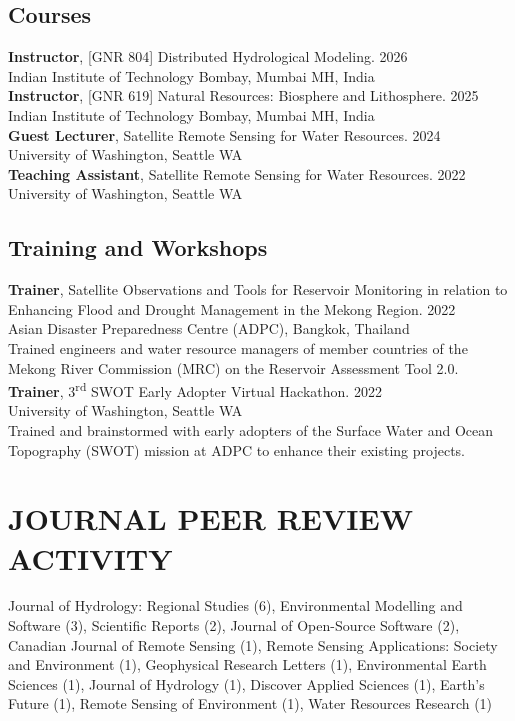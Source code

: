 \documentclass[a4paper,9pt]{extarticle}
\begin{document}
    \subsection*{Courses}
    \noindent
    \textbf{Instructor}, [GNR 804] Distributed Hydrological Modeling. 2026 \\
    Indian Institute of Technology Bombay, Mumbai MH, India \\

    \noindent
    \textbf{Instructor}, [GNR 619] Natural Resources: Biosphere and Lithosphere. 2025 \\
    Indian Institute of Technology Bombay, Mumbai MH, India \\

    \noindent
    \textbf{Guest Lecturer}, Satellite Remote Sensing for Water Resources. 2024 \\
    University of Washington, Seattle WA \\

    \noindent
    \textbf{Teaching Assistant}, Satellite Remote Sensing for Water Resources. 2022 \\
    University of Washington, Seattle WA \\

    \subsection*{Training and Workshops}
    \noindent
    \textbf{Trainer}, Satellite Observations and Tools for Reservoir Monitoring in relation to Enhancing Flood and Drought Management in the Mekong Region. 2022 \\
    Asian Disaster Preparedness Centre (ADPC), Bangkok, Thailand \\
    Trained engineers and water resource managers of member countries of the Mekong River Commission (MRC) on the Reservoir Assessment Tool 2.0. \\

    \noindent
    \textbf{Trainer}, 3\textsuperscript{rd} SWOT Early Adopter Virtual Hackathon. 2022 \\
    University of Washington, Seattle WA \\
    Trained and brainstormed with early adopters of the Surface Water and Ocean Topography (SWOT) mission at ADPC to enhance their existing projects.

\section*{JOURNAL PEER REVIEW ACTIVITY}
    \noindent
    \newline
    Journal of Hydrology: Regional Studies (6), Environmental Modelling and Software (3), Scientific Reports (2), Journal of Open-Source Software (2), Canadian Journal of Remote Sensing (1), Remote Sensing Applications: Society and Environment (1), Geophysical Research Letters (1), Environmental Earth Sciences (1), Journal of Hydrology (1), Discover Applied Sciences (1), Earth's Future (1), Remote Sensing of Environment (1), Water Resources Research (1)
\end{document}
